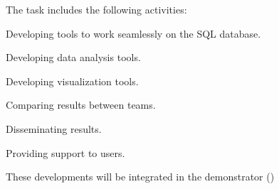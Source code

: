 \begin{task}[
  title=Nuclear Medicine application,
  id=opendose-analysis,
  lead=INSERM,
  PM=24,
  wphases={0-24},
  partners={INSERM}
]
  The task includes the following activities:
  \begin{compactitem}
  \item Developing tools to work seamlessly on the SQL database.
  \item Developing data analysis tools.
  \item Developing visualization tools.
  \item Comparing results between teams.
  \item Disseminating results.
  \item Providing support to users.
  \end{compactitem}
  These developments will be integrated in the demonstrator
  ()

\end{task}
